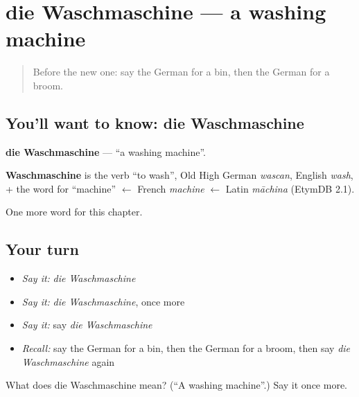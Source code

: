 \section[die Waschmaschine]{die Waschmaschine — a washing machine}

\label{lesson:GE-C115-waschmaschine}



\begin{quote}
Before the new one: say the German for a bin, then the German for a broom.
\end{quote}

\subsection*{You'll want to know: die Waschmaschine}
\textbf{die Waschmaschine} — \textquotedblleft{}a washing machine\textquotedblright{}.

\begin{cousinweb}
\textbf{Waschmaschine} is the verb \textquotedblleft{}to wash\textquotedblright{}, Old High German \emph{wascan}, English \emph{wash}, + the word for \textquotedblleft{}machine\textquotedblright{} $\leftarrow$ French \emph{machine} $\leftarrow$ Latin \emph{māchina} (EtymDB 2.1).
\end{cousinweb}

\begin{grammarlens}[title={What you've built}]
One more word for this chapter.
\end{grammarlens}

\subsection*{Your turn}
\begin{itemize}
\raggedright
  \item \emph{Say it:} \emph{die Waschmaschine}
  \item \emph{Say it:} \emph{die Waschmaschine}, once more
  \item \emph{Say it:} say \emph{die Waschmaschine}
  \item \emph{Recall:} say the German for a bin, then the German for a broom, then say \emph{die Waschmaschine} again
\end{itemize}

\begin{tcolorbox}[breakable,colback=teal!4,colframe=teal!35!black,title={Before you move on}]
What does die Waschmaschine mean? (\textquotedblleft{}A washing machine\textquotedblright{}.) Say it once more.
\end{tcolorbox}
